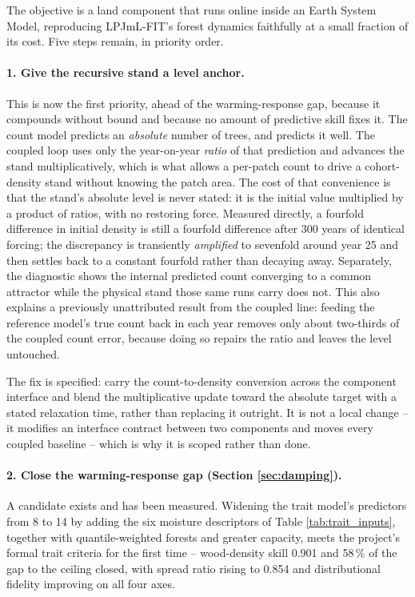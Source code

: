 \documentclass[11pt]{article}
\begin{document}
The objective is a land component that runs online inside an Earth System Model, reproducing LPJmL-FIT's forest dynamics faithfully at a small fraction of its cost. Five steps remain, in priority order.

\paragraph{1. Give the recursive stand a level anchor.}
This is now the first priority, ahead of the warming-response gap, because it compounds without bound and because no amount of predictive skill fixes it. The count model predicts an \emph{absolute} number of trees, and predicts it well. The coupled loop uses only the year-on-year \emph{ratio} of that prediction and advances the stand multiplicatively, which is what allows a per-patch count to drive a cohort-density stand without knowing the patch area. The cost of that convenience is that the stand's absolute level is never stated: it is the initial value multiplied by a product of ratios, with no restoring force. Measured directly, a fourfold difference in initial density is still a fourfold difference after 300 years of identical forcing; the discrepancy is transiently \emph{amplified} to sevenfold around year 25 and then settles back to a constant fourfold rather than decaying away. Separately, the diagnostic shows the internal predicted count converging to a common attractor while the physical stand those same runs carry does not. This also explains a previously unattributed result from the coupled line: feeding the reference model's true count back in each year removes only about two-thirds of the coupled count error, because doing so repairs the ratio and leaves the level untouched.

The fix is specified: carry the count-to-density conversion across the component interface and blend the multiplicative update toward the absolute target with a stated relaxation time, rather than replacing it outright. It is not a local change -- it modifies an interface contract between two components and moves every coupled baseline -- which is why it is scoped rather than done.

\paragraph{2. Close the warming-response gap (Section \ref{sec:damping}).}
A candidate exists and has been measured. Widening the trait model's predictors from 8 to 14 by adding the six moisture descriptors of Table \ref{tab:trait_inputs}, together with quantile-weighted forests and greater capacity, meets the project's formal trait criteria for the first time -- wood-density skill 0.901 and 58\,\% of the gap to the ceiling closed, with spread ratio rising to 0.854 and distributional fidelity improving on all four axes.
\end{document}

